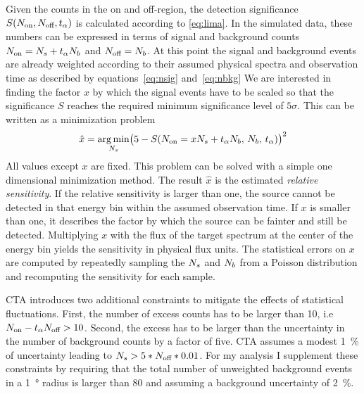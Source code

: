 Given the counts in the on and off-region, the detection significance $S(N_\text{on}, N_\text{off}, t_{\alpha})$ is calculated according to \cref{eq:lima}.
In the simulated data, these numbers can be expressed in terms of signal 
and background counts $N_\text{on} = N_{s} + t_{\alpha} N_{b}$ and $N_\text{off} = N_{b}$.
At this point the signal and background events are already weighted according to their assumed physical spectra and observation time as described 
by equations~\ref{eq:nsig} and~\ref{eq:nbkg} 
We are interested in finding the factor $x$ by which the signal events have to be scaled so that the significance $S$ reaches the required 
minimum significance level of $5\sigma$. This can be written as a minimization problem
\begin{equation*}
    \hat{x} = \operatorname*{arg\,min}_{N_{s}} \bigl(5 - S(N_\text{on} = x N_{s} + t_{\alpha} N_{b}, \, N_{b},\, t_{\alpha})\bigr)^2
\end{equation*}
All values except $x$ are fixed. This problem can be solved with a simple one dimensional minimization method. 
The result $\hat{x}$ is the estimated \emph{relative sensitivity}. If the relative sensitivity is larger than one, the source 
cannot be detected in that energy bin within the assumed observation time. If $x$ is smaller than one, it describes the 
factor by which the source can be fainter and still be detected.
Multiplying $x$ with the flux of the target spectrum at the center of the 
energy bin yields the sensitivity in physical flux units.
The statistical errors on $x$ are computed by repeatedly sampling the $N_{s}$ and $N_{b}$ from a Poisson distribution and recomputing 
the sensitivity for each sample.

CTA introduces two additional constraints to mitigate the effects of statistical fluctuations. 
First, the number of excess counts has to be larger than 10, i.e $N_\text{on} - t_{\alpha} N_\text{off} > 10$.
Second, the excess has to be larger than the uncertainty in the number of background counts by a factor of five.
CTA assumes a modest \SI{1}{\percent} of uncertainty leading to $N_{s}  > 5 * N_\text{off} * 0.01$.
For my analysis I supplement these constraints by requiring that the total number of unweighted background events 
in a \SI{1}{\degree} radius is larger than 80 and assuming a background uncertainty of \SI{2}{\percent}.

